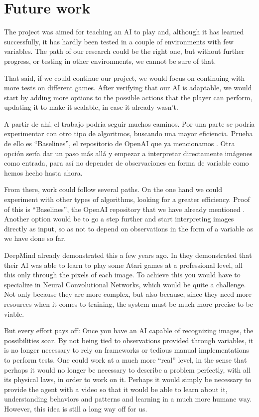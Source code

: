 \section{Future work}

The project was aimed for teaching an AI to play and, although it has learned successfully, it has hardly been tested in a couple of environments with few variables. The path of our research could be the right one, but without further progress, or testing in other environments, we cannot be sure of that.

That said, if we could continue our project, we would focus on continuing with more tests on different games. After verifying that our AI is adaptable, we would start by adding more options to the possible actions that the player can perform, updating it to make it scalable, in case it already wasn't.

A partir de ahí, el trabajo podría seguir muchos caminos. Por una parte se podría experimentar con otro tipo de algoritmos, buscando una mayor eficiencia. Prueba de ello es ``Baselines'', el repositorio de OpenAI que ya mencionamos \citep{baselines}. Otra opción sería dar un paso más allá y empezar a interpretar directamente imágenes como entrada, para así no depender de observaciones en forma de variable como hemos hecho hasta ahora.

From there, work could follow several paths. On the one hand we could experiment with other types of algorithms, looking for a greater efficiency. Proof of this is ``Baselines'', the OpenAI repository that we have already mentioned \citep{baselines}. Another option would be to go a step further and start interpreting images directly as input, so as not to depend on observations in the form of a variable as we have done so far.

DeepMind already demonstrated this a few years ago. In \citet{mnih2013playing} they demonstrated that their AI was able to learn to play some Atari games at a professional level, all this only through the pixels of each image. To achieve this you would have to specialize in Neural Convolutional Networks, which would be quite a challenge. Not only because they are more complex, but also because, since they need more resources when it comes to training, the system must be much more precise to be viable.

But every effort pays off: Once you have an AI capable of recognizing images, the possibilities soar. By not being tied to observations provided through variables, it is no longer necessary to rely on frameworks or tedious manual implementations to perform tests. One could work at a much more ``real'' level, in the sense that perhaps it would no longer be necessary to describe a problem perfectly, with all its physical laws, in order to work on it. Perhaps it would simply be necessary to provide the agent with a video so that it would be able to learn about it, understanding behaviors and patterns and learning in a much more humane way. However, this idea is still a long way off for us.
